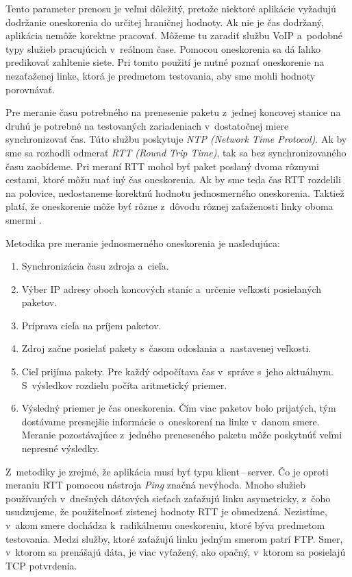 Tento parameter prenosu je veľmi dôležitý, pretože niektoré aplikácie 
vyžadujú dodržanie oneskorenia do určitej hraničnej hodnoty. Ak nie je čas
dodržaný,
aplikácia nemôže korektne pracovať. Môžeme tu zaradiť službu VoIP a~podobné 
typy služieb pracujúcich v~reálnom čase. Pomocou oneskorenia sa dá ľahko
predikovať zahltenie siete. Pri tomto použití je nutné poznať oneskorenie na
nezaťaženej linke, ktorá je predmetom testovania, aby sme mohli hodnoty
porovnávať. 

Pre meranie času potrebného na prenesenie paketu z~jednej
koncovej stanice na druhú je potrebné na testovaných zariadeniach
v~dostatočnej miere synchronizovať čas. Túto službu poskytuje \emph{NTP (Network Time
Protocol)}. Ak by sme sa rozhodli odmerať \emph{RTT (Round Trip Time)}, tak sa
bez synchronizovaného času zaobídeme. Pri meraní RTT mohol byť
paket poslaný dvoma rôznymi cestami, ktoré môžu mať iný čas oneskorenia.
Ak by sme teda čas RTT rozdelili na polovice, nedostaneme korektnú
hodnotu jednosmerného oneskorenia. 
Taktiež platí, že oneskorenie môže byť rôzne
z~dôvodu rôznej zaťaženosti linky oboma smermi \cite{rfc_delay_metric}.

\noindent Metodika pre meranie jednosmerného oneskorenia je nasledujúca:
\begin{enumerate}
    \item Synchronizácia času zdroja a~cieľa.
    \item Výber IP adresy oboch koncových staníc a~určenie veľkosti posielaných
        paketov.
    \item Príprava cieľa na príjem paketov.
    \item Zdroj začne posielať pakety s~časom odoslania a~nastavenej veľkosti.  
    \item Cieľ prijíma pakety. Pre každý odpočítava čas v~správe 
        s~jeho aktuálnym. S~výsledkov rozdielu počíta aritmetický priemer.
    \item Výsledný priemer je čas oneskorenia. Čím viac paketov bolo
        prijatých, tým dostávame presnejšie informácie o~oneskorení na 
        linke v~danom smere. Meranie pozostávajúce z~jedného preneseného paketu 
        môže poskytnúť veľmi nepresné výsledky.
\end{enumerate}

Z~metodiky je zrejmé, že aplikácia musí byť 
typu klient\,--\,server. Čo je oproti meraniu RTT pomocou nástroja
\emph{Ping} značná nevýhoda. Mnoho služieb používaných v~dnešných dátových
sieťach zaťažujú linku asymetricky, z~čoho usudzujeme, že použiteľnosť zistenej 
hodnoty RTT je obmedzená. Nezistíme, v~akom smere dochádza
k~radikálnemu oneskoreniu, ktoré býva predmetom testovania. Medzi služby,
ktoré zaťažujú linku jedným smerom patrí FTP. Smer,
v~ktorom sa prenášajú dáta, je viac vyťažený, ako opačný,
v~ktorom sa posielajú TCP potvrdenia.

